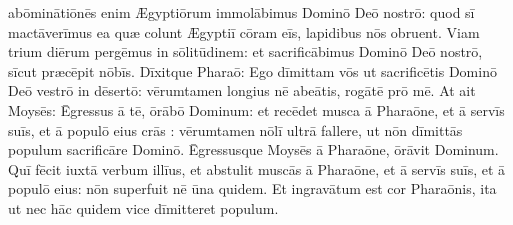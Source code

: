abōminātiōnēs enim Ægyptiōrum immolābimus Dominō Deō nostrō: quod sī mactāverīmus
ea quæ colunt Ægyptiī cōram eīs, lapidibus nōs
obruent.  Viam trium diērum pergēmus in
sōlitūdinem: et
sacrificābimus Dominō Deō nostrō, sīcut
præcēpit nōbīs.  Dīxitque
Pharaō: Ego dīmittam vōs ut sacrificētis
Dominō Deō vestrō in dēsertō: vērumtamen longius nē
abeātis, rogātē prō mē.  At ait Moysēs: Ēgressus ā tē,
ōrābō Dominum: et recēdet musca ā
Pharaōne, et ā servīs suīs, et ā populō eius crās :
vērumtamen nōlī ultrā fallere, ut nōn dīmittās populum
sacrificāre Dominō.  Ēgressusque Moysēs ā
Pharaōne, ōrāvit Dominum.  Quī fēcit iuxtā verbum illīus,
et abstulit muscās ā Pharaōne, et ā servīs
suīs, et ā populō eius: nōn superfuit nē ūna quidem.  Et
ingravātum est cor
Pharaōnis, ita ut nec hāc quidem vice dīmitteret populum.

